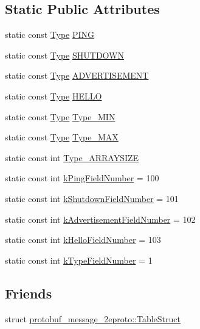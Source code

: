\subsection*{Static Public Attributes}
\begin{DoxyCompactItemize}
\item 
static const \hyperlink{message_8pb_8h_a1b620cd54f3d6b48f3c5f7979545b160}{Type} \hyperlink{class_message_abc34006eaf98f78c4f90767fd89f7216}{P\+I\+NG}
\item 
static const \hyperlink{message_8pb_8h_a1b620cd54f3d6b48f3c5f7979545b160}{Type} \hyperlink{class_message_ad4dfaa2599a7afc20df9fd87b0f09fea}{S\+H\+U\+T\+D\+O\+WN}
\item 
static const \hyperlink{message_8pb_8h_a1b620cd54f3d6b48f3c5f7979545b160}{Type} \hyperlink{class_message_a9079ebddf775dd11d7bae2ec733e961d}{A\+D\+V\+E\+R\+T\+I\+S\+E\+M\+E\+NT}
\item 
static const \hyperlink{message_8pb_8h_a1b620cd54f3d6b48f3c5f7979545b160}{Type} \hyperlink{class_message_a6bda6b58f826adddb08642316e32ed1f}{H\+E\+L\+LO}
\item 
static const \hyperlink{message_8pb_8h_a1b620cd54f3d6b48f3c5f7979545b160}{Type} \hyperlink{class_message_a9fc82f92e8d5c8d07f77e60d057a4077}{Type\+\_\+\+M\+IN}
\item 
static const \hyperlink{message_8pb_8h_a1b620cd54f3d6b48f3c5f7979545b160}{Type} \hyperlink{class_message_aad308e35392d6a12f366c39c06d4dd92}{Type\+\_\+\+M\+AX}
\item 
static const int \hyperlink{class_message_afdad43f1f3fd8af53d430fa57b3c85f9}{Type\+\_\+\+A\+R\+R\+A\+Y\+S\+I\+ZE}
\item 
static const int \hyperlink{class_message_a2197ba45f05dac9a2bd760c7b3a2d1a4}{k\+Ping\+Field\+Number} = 100
\item 
static const int \hyperlink{class_message_abcfb3771be4f6daf22c28853761bcd33}{k\+Shutdown\+Field\+Number} = 101
\item 
static const int \hyperlink{class_message_a75120b6dcf3c241e7e79c6244714031b}{k\+Advertisement\+Field\+Number} = 102
\item 
static const int \hyperlink{class_message_a48c7ce9a4b7f9205834eb1f9c0b0d88a}{k\+Hello\+Field\+Number} = 103
\item 
static const int \hyperlink{class_message_a7e929836116d1d4afdf1048ee821637a}{k\+Type\+Field\+Number} = 1
\end{DoxyCompactItemize}
\subsection*{Friends}
\begin{DoxyCompactItemize}
\item 
struct \hyperlink{class_message_a2a479fe4885e147bf2a7ae83f2bf282e}{protobuf\+\_\+message\+\_\+2eproto\+::\+Table\+Struct}
\end{DoxyCompactItemize}


